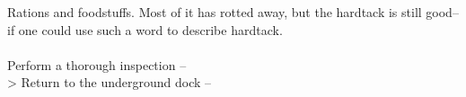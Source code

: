 Rations and foodstuffs. Most of it has rotted away, but the hardtack is still good--if one could use such a word to describe hardtack.\\
\\

 Perform a thorough inspection -- \\
> Return to the underground dock -- 